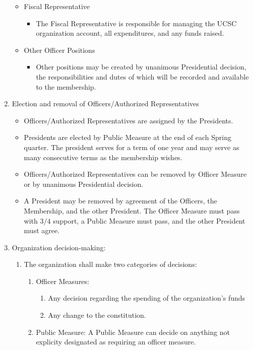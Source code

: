\documentclass{article}
\begin{document}
\begin{enumerate}
\begin{itemize}
    \item
      Fiscal Representative
      \begin{itemize}
        \item The Fiscal Representative is responsible for managing the UCSC organization account, all expenditures, and any funds raised. 
      \end{itemize}
    \item
      Other Officer Positions
      \begin{itemize}
        \item Other positions may be created by unanimous Presidential decision, the responsibilities and dutes of which will be recorded and available to the membership.  
      \end{itemize}

  \end{itemize}

\item
  Election and removal of Officers/Authorized Representatives
  \begin{itemize}
    \item
      Officers/Authorized Representatives are assigned by the Presidents. 
    \item
      Presidents are elected by Public Measure at the end of each Spring quarter. The president serves for a term of one year and may serve as many consecutive terms as the membership wishes.
    \item
      Officers/Authorized Representatives can be removed by Officer Measure or by unanimous Presidential decision. 
    \item
      A President may be removed by agreement of the Officers, the Membership, and the other President. The Officer Measure must pass with $3/4$ support, a Public Measure must pass, and the other President must agree.
  \end{itemize}

\item
  Organization decision-making:
  \begin{enumerate}
  \item
    The organization shall make two categories of decisions: 
    \begin{enumerate}
    \item
      Officer Measures: 
      \begin{enumerate}
        \item Any decision regarding the spending of the organization's funds
        \item Any change to the constitution.
      \end{enumerate}
    \item
      Public Measure: A Public Measure can decide on anything not explicity designated as requiring an officer measure.
    \end{enumerate}


\end{enumerate}
\end{enumerate}
\end{document}
